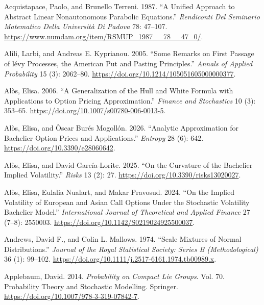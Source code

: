 \documentclass[
  english,
  11pt,
  letterpaper,
  DIV=11,
  numbers=noendperiod]{scrartcl}
\newlength{\cslhangindent}
\newenvironment{CSLReferences}[2] %
 {\begin{list}{}{%
  \setlength{\itemindent}{0pt}
  \setlength{\leftmargin}{0pt}
  \setlength{\parsep}{0pt}
  \ifodd #1
   \setlength{\leftmargin}{\cslhangindent}
   \setlength{\itemindent}{-1\cslhangindent}
  \fi
  \setlength{\itemsep}{#2\baselineskip}}}
 {\end{list}}
\theoremstyle{plain}
\theoremstyle{plain}
\theoremstyle{plain}
\theoremstyle{plain}
\theoremstyle{remark}
\begin{document}
\protect{}\label{refs}
\begin{CSLReferences}{1}{1}
Acquistapace, Paolo, and Brunello Terreni. 1987. {``A Unified Approach
to Abstract Linear Nonautonomous Parabolic Equations.''}
\emph{Rendiconti Del Seminario Matematico Della Universit{à} Di Padova}
78: 47--107. \url{https://www.numdam.org/item/RSMUP_1987__78__47_0/}.

Alili, Larbi, and Andreas E. Kyprianou. 2005. {``Some Remarks on First
Passage of l{é}vy Processes, the American Put and Pasting Principles.''}
\emph{Annals of Applied Probability} 15 (3): 2062--80.
\url{https://doi.org/10.1214/105051605000000377}.

Alòs, Elisa. 2006. {``A Generalization of the {Hull and White} Formula
with Applications to Option Pricing Approximation.''} \emph{Finance and
Stochastics} 10 (3): 353--65.
\url{https://doi.org/10.1007/s00780-006-0013-5}.

Alòs, Elisa, and Òscar Burés Mogollón. 2026. {``Analytic Approximation
for {Bachelier} Option Prices and Applications.''} \emph{Entropy} 28
(6): 642. \url{https://doi.org/10.3390/e28060642}.

Alòs, Elisa, and David García-Lorite. 2025. {``On the Curvature of the
{Bachelier} Implied Volatility.''} \emph{Risks} 13 (2): 27.
\url{https://doi.org/10.3390/risks13020027}.

Alòs, Elisa, Eulalia Nualart, and Makar Pravosud. 2024. {``On the
Implied Volatility of European and Asian Call Options Under the
Stochastic Volatility {Bachelier} Model.''} \emph{International Journal
of Theoretical and Applied Finance} 27 (7--8): 2550003.
\url{https://doi.org/10.1142/S0219024925500037}.

Andrews, David F., and Colin L. Mallows. 1974. {``Scale Mixtures of
Normal Distributions.''} \emph{Journal of the Royal Statistical Society:
Series B (Methodological)} 36 (1): 99--102.
\url{https://doi.org/10.1111/j.2517-6161.1974.tb00989.x}.

Applebaum, David. 2014. \emph{Probability on Compact Lie Groups}. Vol.
70. Probability Theory and Stochastic Modelling. Springer.
\url{https://doi.org/10.1007/978-3-319-07842-7}.


\end{CSLReferences}
\end{document}
